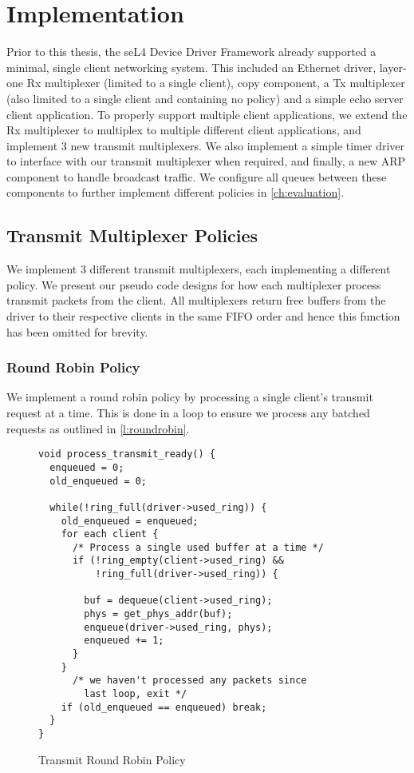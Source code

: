 \chapter{Implementation}\label{ch:implementation}

Prior to this thesis, the seL4 Device Driver Framework already supported a minimal, single client
networking system. This included an Ethernet driver, layer-one Rx multiplexer (limited to a single 
client), copy component, a Tx multiplexer (also limited to a single client and containing no policy) and 
a simple echo server client application. To properly support multiple client applications, we
extend the Rx multiplexer to multiplex to multiple different client applications, and implement 3
new transmit multiplexers. We also implement a simple timer driver to interface with our 
transmit multiplexer when required, and finally, a new ARP component to handle broadcast traffic. 
We configure all queues between these components to further implement different
policies in \autoref{ch:evaluation}.


\section{Transmit Multiplexer Policies}

We implement 3 different transmit multiplexers, each implementing a different policy. 
We present our pseudo code designs for how each multiplexer process transmit packets from
the client. All multiplexers return free buffers from the driver to their respective 
clients in the same FIFO order and hence this function has been omitted for brevity. 

\subsection{Round Robin Policy}
We implement a round robin policy by processing a single client's transmit request at a time.
This is done in a loop to ensure we process any batched requests as outlined in \autoref{l:roundrobin}.

\begin{figure} [H]
    \begin{verbatim}
void process_transmit_ready() {
  enqueued = 0;
  old_enqueued = 0;

  while(!ring_full(driver->used_ring)) {
    old_enqueued = enqueued;
    for each client {
      /* Process a single used buffer at a time */
      if (!ring_empty(client->used_ring) &&
          !ring_full(driver->used_ring)) {
        
        buf = dequeue(client->used_ring);
        phys = get_phys_addr(buf);
        enqueue(driver->used_ring, phys);
        enqueued += 1;
      }
    }
      /* we haven't processed any packets since 
        last loop, exit */
    if (old_enqueued == enqueued) break;
  }
}
\end{verbatim}
\caption{Transmit Round Robin Policy}
\label{l:roundrobin}
\end{figure}

